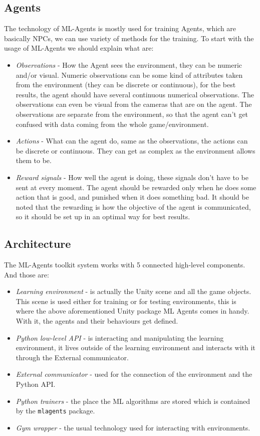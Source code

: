\documentclass[a4paper, 12pt]{book}
\begin{document}
\subsection{Agents}

The technology of ML-Agents is mostly used for training Agents, which are basically NPCs, we can use variety of methods for the training. To start with the usage of ML-Agents we should explain what are:

\begin{itemize}
    \item \emph{Observations} - How the Agent sees the environment, they can be numeric and/or visual. Numeric observations can be some kind of attributes taken from the environment (they can be discrete or continuous), for the best results, the agent should have several continuous numerical observations. The observations can even be visual from the cameras that are on the agent. The observations are separate from the environment, so that the agent can't get confused with data coming from the whole game/environment.
    \item \emph{Actions} - What can the agent do, same as the observations, the actions can be discrete or continuous. They can get as complex as the environment allows them to be.
    \item \emph{Reward signals} - How well the agent is doing, these signals don't have to be sent at every moment. The agent should be rewarded only when he does some action that is good, and punished when it does something bad. It should be noted that the rewarding is how the objective of the agent is communicated, so it should be set up in an optimal way for best results.
\end{itemize}

\subsection{Architecture}

The ML-Agents toolkit system works with 5 connected high-level components. And those are:

\begin{itemize}
    \item \emph{Learning environment} - is actually the Unity scene and all the game objects. This scene is used either for training or for testing environments, this is where the above aforementioned Unity package ML Agents comes in handy. With it, the agents and their behaviours get defined.
    \item \emph{Python low-level API} - is interacting and manipulating the learning environment, it lives outside of the learning environment and interacts with it through the External communicator.
    \item \emph{External communicator} - used for the connection of the environment and the Python API.
    \item \emph{Python trainers} - the place the ML algorithms are stored which is contained by the \texttt{mlagents} package.
    \item \emph{Gym wrapper} \cite{openAIGym} - the usual technology used for interacting with environments.
\end{itemize}
\end{document}
